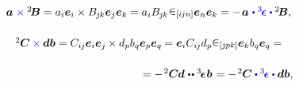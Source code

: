 \nopagebreak\vspace{-0.1em}\begin{equation*}
\begin{array}{c}
\bm{a} \hspace{.1ex} \mathcolor{blue}{\times} {^2\hspace{-0.16em}\bm{B}} = a_i \bm{e}_i \times B_{\hspace{-0.1ex}j\hspace{-0.1ex}k} \bm{e}_j \bm{e}_k \hspace{-0.1ex} = \tikzmark{BeginVectorCrossTensor} a_i B_{\hspace{-0.1ex}j\hspace{-0.1ex}k} \hspace{.1ex} \permutationsparitysymbols{i\hspace{-0.1ex}jn} \tikzmark{EndVectorCrossTensor} \bm{e}_n \bm{e}_k = \mathcolor{blue}{-} \hspace{.2ex} \bm{a} \hspace{.15ex} \mathcolor{blue}{\dotp \permutationsparitytensor \dotp} {^2\!\bm{B}} ,
\\[1.6em]
%
{^2\hspace{-0.05ex}\bm{C}} \mathcolor{blue}{\times} \hspace{-0.1ex} \bm{d} \bm{b} = C_{i\hspace{-0.1ex}j} \bm{e}_i \bm{e}_j \hspace{-0.1ex} \times d_p b_q \bm{e}_p \bm{e}_q \hspace{-0.1ex} = \bm{e}_i C_{i\hspace{-0.1ex}j} d_p \tikzmark{BeginTensorCrossTensor} \permutationsparitysymbols{j\hspace{-0.1ex}pk} \tikzmark{EndTensorCrossTensor} \bm{e}_k b_q \bm{e}_q =
\\[1.6em]
\hspace{12.5em} =
- \hspace{.2ex} {^2\hspace{-0.05ex}\bm{C}} \hspace{-0.1ex} \bm{d} \hspace{.12ex} \dotdotp \permutationsparitytensor \hspace{.1ex} \bm{b} \hspace{.2ex} =
\mathcolor{blue}{-} \hspace{.2ex} {^2\hspace{-0.05ex}\bm{C}} \mathcolor{blue}{\dotp \permutationsparitytensor \dotp} \bm{d} \bm{b} ,
\\
\end{array}
\end{equation*}%
